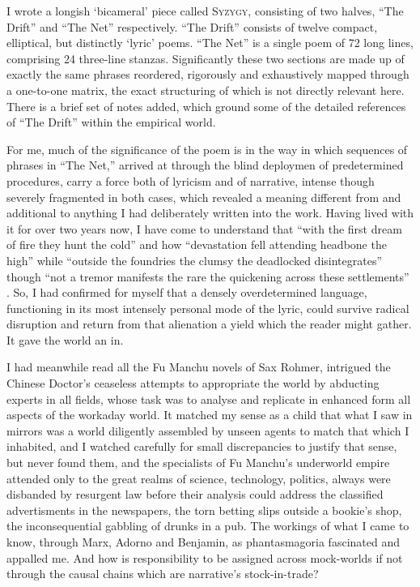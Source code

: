 \documentclass[
]{memoir}
\begin{document}
I wrote a longish `bicameral' piece called \textsc{Syzygy}, consisting
of two halves, ``The Drift'' and ``The Net'' respectively. ``The Drift''
consists of twelve compact, elliptical, but distinctly `lyric' poems.
``The Net'' is a single poem of 72 long lines, comprising 24 three-line
stanzas. Significantly these two sections are made up of exactly the
same phrases reordered, rigorously and exhaustively mapped through a
one-to-one matrix, the exact structuring of which is not directly
relevant here. There is a brief set of notes added, which ground some of
the detailed references of ``The Drift'' within the empirical world.

For me, much of the significance of the poem is in the way in which
sequences of phrases in ``The Net,'' arrived at through the blind
deploymen of predetermined procedures, carry a force both of lyricism
and of narrative, intense though severely fragmented in both cases,
which revealed a meaning different from and additional to anything I had
deliberately written into the work. Having lived with it for over two
years now, I have come to understand that ``with the first dream of fire
they hunt the cold'' and how ``devastation fell attending headbone the
high'' while ``outside the foundries the clumsy the deadlocked
disintegrates'' though ``not a tremor manifests the rare the quickening
across these settlements'' . So, I had confirmed for myself that a
densely overdetermined language, functioning in its most intensely
personal mode of the lyric, could survive radical disruption and return
from that alienation a yield which the reader might gather. It gave the
world an in.

I had meanwhile read all the Fu Manchu novels of Sax Rohmer, intrigued
the Chinese Doctor's ceaseless attempts to appropriate the world by
abducting experts in all fields, whose task was to analyse and replicate
in enhanced form all aspects of the workaday world. It matched my sense
as a child that what I saw in mirrors was a world diligently assembled
by unseen agents to match that which I inhabited, and I watched
carefully for small discrepancies to justify that sense, but never found
them, and the specialists of Fu Manchu's underworld empire attended only
to the great realms of science, technology, politics, always were
disbanded by resurgent law before their analysis could address the
classified advertisments in the newspapers, the torn betting slips
outside a bookie's shop, the inconsequential gabbling of drunks in a
pub. The workings of what I came to know, through Marx, Adorno and
Benjamin, as phantasmagoria fascinated and appalled me. And how is
responsibility to be assigned across mock-worlds if not through the
causal chains which are narrative's stock-in-trade?
\end{document}
